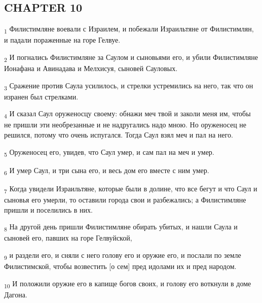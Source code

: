 \subsection{CHAPTER 10}
\begin{tcolorbox}
\textsubscript{1} Филистимляне воевали с Израилем, и побежали Израильтяне от Филистимлян, и падали пораженные на горе Гелвуе.
\end{tcolorbox}
\begin{tcolorbox}
\textsubscript{2} И погнались Филистимляне за Саулом и сыновьями его, и убили Филистимляне Ионафана и Авинадава и Мелхисуя, сыновей Сауловых.
\end{tcolorbox}
\begin{tcolorbox}
\textsubscript{3} Сражение против Саула усилилось, и стрелки устремились на него, так что он изранен был стрелками.
\end{tcolorbox}
\begin{tcolorbox}
\textsubscript{4} И сказал Саул оруженосцу своему: обнажи меч твой и заколи меня им, чтобы не пришли эти необрезанные и не надругались надо мною. Но оруженосец не решился, потому что очень испугался. Тогда Саул взял меч и пал на него.
\end{tcolorbox}
\begin{tcolorbox}
\textsubscript{5} Оруженосец его, увидев, что Саул умер, и сам пал на меч и умер.
\end{tcolorbox}
\begin{tcolorbox}
\textsubscript{6} И умер Саул, и три сына его, и весь дом его вместе с ним умер.
\end{tcolorbox}
\begin{tcolorbox}
\textsubscript{7} Когда увидели Израильтяне, которые были в долине, что все бегут и что Саул и сыновья его умерли, то оставили города свои и разбежались; а Филистимляне пришли и поселились в них.
\end{tcolorbox}
\begin{tcolorbox}
\textsubscript{8} На другой день пришли Филистимляне обирать убитых, и нашли Саула и сыновей его, павших на горе Гелвуйской,
\end{tcolorbox}
\begin{tcolorbox}
\textsubscript{9} и раздели его, и сняли с него голову его и оружие его, и послали по земле Филистимской, чтобы возвестить [о сем] пред идолами их и пред народом.
\end{tcolorbox}
\begin{tcolorbox}
\textsubscript{10} И положили оружие его в капище богов своих, и голову его воткнули в доме Дагона.
\end{tcolorbox}
